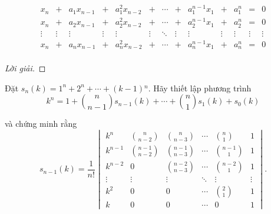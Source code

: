 \documentclass[class=linearalgebra,crop=false]{standalone}
\begin{document}
\begin{exercise}
    \[
        \begin{array}{ccccccccccccc}
            x_{n}  & +      & a_{1}x_{n-1} & +      & a_{1}^{2}x_{n-2} & +      & \cdots & +      & a_{1}^{n-1}x_{1} & +      & a_{1}^{n} & =      & 0      \\
            x_{n}  & +      & a_{2}x_{n-1} & +      & a_{2}^{2}x_{n-2} & +      & \cdots & +      & a_{2}^{n-1}x_{1} & +      & a_{2}^{n} & =      & 0      \\
            \vdots & \vdots & \vdots       & \vdots & \vdots           & \vdots & \ddots & \vdots & \vdots           & \vdots & \vdots    & \vdots & \vdots \\
            x_{n}  & +      & a_{n}x_{n-1} & +      & a_{n}^{2}x_{n-2} & +      & \cdots & +      & a_{n}^{n-1}x_{1} & +      & a_{n}^{n} & =      & 0      \\
        \end{array}
    \]
\end{exercise}

\begin{proof}[Lời giải]
\end{proof}

\begin{exercise}
    \par Đặt $s_{n}(k) = 1^{n} + 2^{n} + \cdots + (k-1){}^{n}$. Hãy thiết lập phương trình
    \[
        k^{n} = 1 + \binom{n}{n-1}s_{n-1}(k) + \cdots + \binom{n}{1}s_{1}(k) + s_{0}(k)
    \]
    \par và chứng minh rằng
    \[
        s_{n-1}(k) = \frac{1}{n!}
        \begin{vmatrix}
            k^{n}   & \binom{n}{n-2}   & \binom{n}{n-3}   & \cdots & \binom{n}{1}   & 1      \\
            k^{n-1} & \binom{n-1}{n-2} & \binom{n-1}{n-3} & \cdots & \binom{n-1}{1} & 1      \\
            k^{n-2} & 0                & \binom{n-2}{n-3} & \cdots & \binom{n-2}{1} & 1      \\
            \vdots  & \vdots           & \vdots           & \ddots & \vdots         & \vdots \\
            k^{2}   & 0                & 0                & \cdots & \binom{2}{1}   & 1      \\
            k       & 0                & 0                & \cdots & 0              & 1
        \end{vmatrix}.
    \]
\end{exercise}
\end{document}
